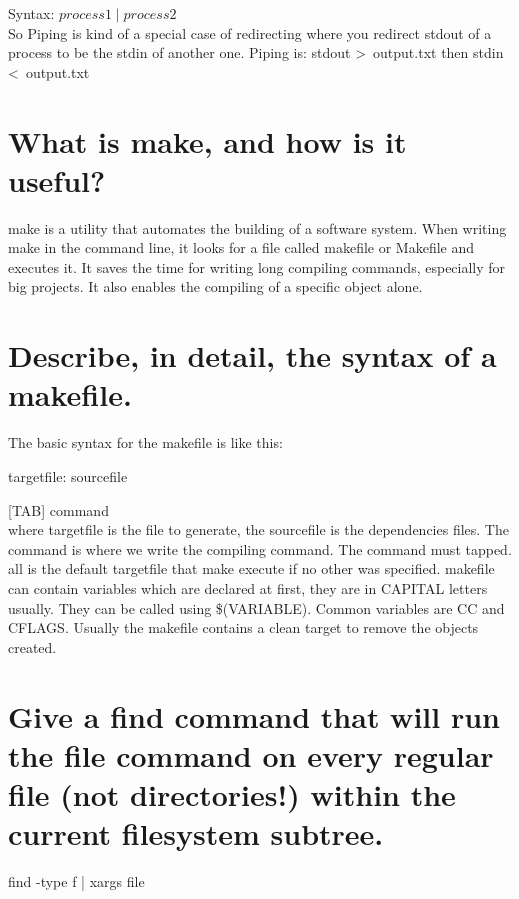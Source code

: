 \documentclass[a4paper]{article}
\begin{document}
Syntax: $process1 \mid process2$\\ 
So Piping is kind of a special case of redirecting where you redirect stdout of a process to be the stdin of another one. Piping is: stdout \textgreater \ output.txt then stdin \textless \ output.txt


\section{What is make, and how is it useful?}

make is a utility that automates the building of a software system. When writing make in the command line, it looks for a file called makefile or Makefile and executes it. It saves the time for writing long compiling commands, especially for big projects. It also enables the compiling of a specific object alone. 

\section{Describe, in detail, the syntax of a makefile.}

The basic syntax for the makefile is like this:
	
    targetfile: sourcefile
		
        [TAB] command\\
	where targetfile is the file to generate, the sourcefile is the dependencies files. The command is where we write the compiling command. The command must tapped. all is the default targetfile that make execute if no other was specified. makefile can contain variables which are declared at first, they are in CAPITAL letters usually. They can be called using \$(VARIABLE). Common variables are CC and CFLAGS. Usually the makefile contains a clean target to remove the objects created.
    
\section{Give a find command that will run the file command on every regular file (not directories!) within the current filesystem subtree.}
find -type f | xargs file
\end{document}
